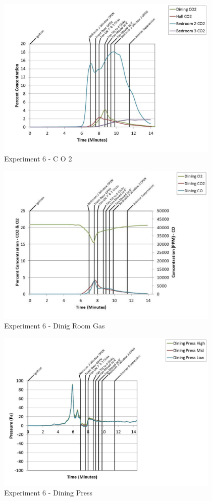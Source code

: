 \documentclass{article}
\begin{document}
\begin{appendices}
	\clearpage

	\begin{figure}[h!]
		\centering
		\includegraphics[height=3.05in]{0_Images/Results_Charts/Exp_6_Charts/CO2.pdf}
		\caption{Experiment 6 - C O 2}
	\end{figure}
 

	\begin{figure}[h!]
		\centering
		\includegraphics[height=3.05in]{0_Images/Results_Charts/Exp_6_Charts/DinigRoomGas.pdf}
		\caption{Experiment 6 - Dinig Room Gas}
	\end{figure}
 
	\clearpage

	\begin{figure}[h!]
		\centering
		\includegraphics[height=3.05in]{0_Images/Results_Charts/Exp_6_Charts/DiningPress.pdf}
		\caption{Experiment 6 - Dining Press}
	\end{figure}
 


\end{appendices}
\end{document}
